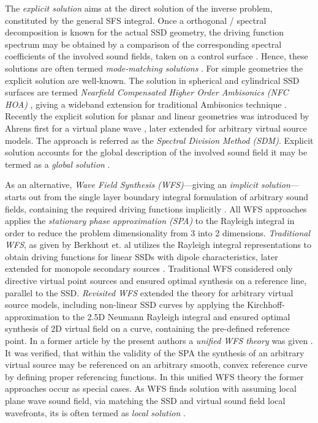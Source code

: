 \documentclass[journal]{IEEEtran}
\begin{document}
The \emph{explicit solution} aims at the direct solution of the inverse problem, constituted by the general SFS integral. 
Once a orthogonal / spectral decomposition is known for the actual SSD geometry, the driving function spectrum may be obtained by a comparison of the corresponding spectral coefficients of the involved sound fields, taken on a control surface \cite{Ahrens2010phd}.
Hence, these solutions are often termed \emph{mode-matching solutions} \cite{Fazi2010}.
For simple geometries the explicit solution are well-known.
The solution in spherical and cylindrical SSD surfaces are termed \emph{Nearfield Compensated Higher Order Ambisonics (NFC HOA)} \cite{Ahrens2009:circular25D_SFR,Ahrens2008:Analytical_Circ_Spherical_SFS,Poletti2005,Zotter2009phd}, giving a wideband extension for  traditional Ambisonics technique \cite{Gerzon1973}.
Recently the explicit solution for planar and linear geometries was introduced by Ahrens first for a virtual plane wave \cite{Ahrens2008_SDMInit,Ahrens2010a,Ahrens2012:Ambisonics_for_planar_linear}, later extended for arbitrary virtual source models.
The approach is referred as the \emph{Spectral Division Method (SDM)}.
Explicit solution accounts for the global description of the involved sound field it may be termed as a \emph{global solution} \cite{Ahrens2012}.

As an alternative, \emph{Wave Field Synthesis (WFS)}---giving an \emph{implicit solution}---starts out from the single layer boundary integral formulation of arbitrary sound fields, containing the required driving functions implicitly \cite{Vries2009}.
All WFS approaches applies the \emph{stationary phase approximation (SPA)} to the Rayleigh integral in order to reduce the problem dimensionality from 3 into 2 dimensions.
\emph{Traditional WFS}, as given by Berkhout et. al \cite{Berkhout1988,Berkhout1993:Acoustic_control_by_WFS} utilizes the Rayleigh integral representations to obtain driving functions for linear SSDs with dipole characteristics, later extended for monopole secondary sources \cite{Vogel1993:phd,Start1997:phd,Verheijen1997:phd}. 
Traditional WFS considered only directive virtual point sources and ensured optimal synthesis on a reference line, parallel to the SSD. 
\emph{Revisited WFS} \cite{Spors2008:WFSrevisited} extended the theory for arbitrary virtual source models, including non-linear SSD curves by applying the Kirchhoff-approximation to the 2.5D Neumann Rayleigh integral and ensured optimal synthesis of 2D virtual field on a curve, containing the pre-defined reference point.
In a former article by the present authors a \emph{unified WFS theory} was given \cite{Firtha2016:UnifiedWFS}.
It was verified, that within the validity of the SPA the synthesis of an arbitrary virtual source may be referenced on an arbitrary smooth, convex reference curve by defining proper referencing functions.
In this unified WFS theory the former approaches occur as special cases. As WFS finds solution with assuming local plane wave sound field, via matching the SSD and virtual sound field local wavefronts, its is often termed as \emph{local solution} \cite{Ahrens2012}.
\end{document}
